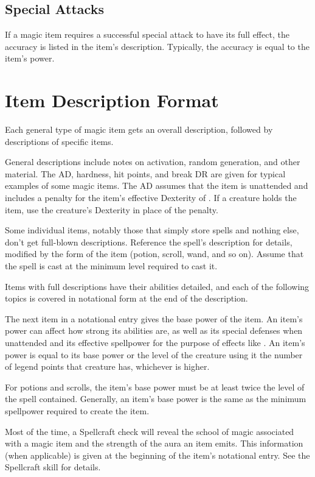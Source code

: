 \subsection{Special Attacks}

If a magic item requires a successful special attack to have its full effect, the accuracy is listed in the item's description.
Typically, the accuracy is equal to the item's power.

\section{Item Description Format}

Each general type of magic item gets an overall description, followed by descriptions of specific items.

General descriptions include notes on activation, random generation, and other material.
The AD, hardness, hit points, and break DR are given for typical examples of some magic items.
The AD assumes that the item is unattended and includes a  penalty for the item's effective Dexterity of .
If a creature holds the item, use the creature's Dexterity in place of the  penalty.

Some individual items, notably those that simply store spells and nothing else, don't get full-blown descriptions.
Reference the spell's description for details, modified by the form of the item (potion, scroll, wand, and so on).
Assume that the spell is cast at the minimum level required to cast it.

Items with full descriptions have their abilities detailed, and each of the following topics is covered in notational form at the end of the description.

 The next item in a notational entry gives the base power of the item.
An item's power can affect how strong its abilities are, as well as its special defenses when unattended and its effective spellpower for the purpose of effects like .
An item's power is equal to its base power or the level of the creature using it \add the number of legend points that creature has, whichever is higher.

For potions and scrolls, the item's base power must be at least twice the level of the spell contained.
Generally, an item's base power is the same as the minimum spellpower required to create the item.

 Most of the time, a Spellcraft check will reveal the school of magic associated with a magic item and the strength of the aura an item emits.
This information (when applicable) is given at the beginning of the item's notational entry.
See the Spellcraft skill for details.


